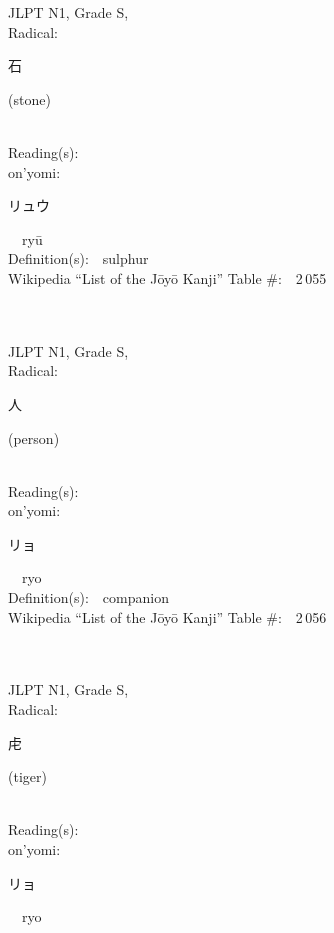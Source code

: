 \begin{multicols}{2}
{JLPT N1, Grade S, \\Radical:\ \ {\begin{CJK}{UTF8}{min} 石 \end{CJK}} (stone) } \\
Reading(s):\ \ \\
{\hspace*{1em}}on'yomi:\ \ \\
{\hspace*{2em}}{\begin{CJK}{UTF8}{min} リュウ \end{CJK}}\ \ ry\=u\ \ \\
Definition(s):\ \ sulphur \\
Wikipedia ``List of the J\=oy\=o Kanji'' Table \#:\ \ 2\,055 \\
\ \ \\
{\fontsize{34pt}{40pt}  }\ \ \\
{JLPT N1, Grade S, \\Radical:\ \ {\begin{CJK}{UTF8}{min} 人 \end{CJK}} (person) } \\
Reading(s):\ \ \\
{\hspace*{1em}}on'yomi:\ \ \\
{\hspace*{2em}}{\begin{CJK}{UTF8}{min} リョ \end{CJK}}\ \ ryo\ \ \\
Definition(s):\ \ companion \\
Wikipedia ``List of the J\=oy\=o Kanji'' Table \#:\ \ 2\,056 \\
\ \ \\
{\fontsize{34pt}{40pt}  }\ \ \\
{JLPT N1, Grade S, \\Radical:\ \ {\begin{CJK}{UTF8}{min} 虍 \end{CJK}} (tiger) } \\
Reading(s):\ \ \\
{\hspace*{1em}}on'yomi:\ \ \\
{\hspace*{2em}}{\begin{CJK}{UTF8}{min} リョ \end{CJK}}\ \ ryo\ \ \\

\end{multicols}

